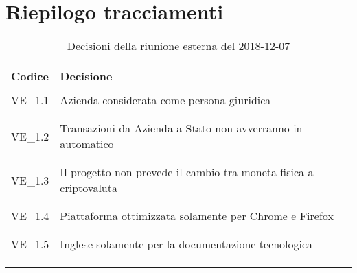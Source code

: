 \section{Riepilogo tracciamenti}
\begin{centering}
\begin{longtable}{ >{\centering}p{4cm} >{\centering}p{11cm} }

\hline
\\[0.5pt]
	\textbf{Codice} & \textbf{Decisione} 
	
	\tabularnewline 
	\hline
	
	
				\\[0.5pt]
				VE\_1.1 & Azienda considerata come persona giuridica
				\\[0.5pt]
				\tabularnewline
				\hline
						
				\\[0.5pt]
				VE\_1.2 & Transazioni da Azienda a Stato non avverranno in automatico
				\\[0.5pt]
				\tabularnewline
				\hline
				
				\\[0.5pt]
				VE\_1.3 & Il progetto non prevede il cambio tra moneta fisica a criptovaluta
				\\[0.5pt]
				\tabularnewline
				\hline
								
				\\[0.5pt]
				VE\_1.4 & Piattaforma ottimizzata solamente per Chrome e Firefox
				\\[0.5pt]
				\tabularnewline
				\hline
				
				\\[0.5pt]
				VE\_1.5 & Inglese solamente per la documentazione tecnologica
				\\[0.5pt]
				\tabularnewline
				\hline
				
                
        \\[0.7pt]
        \caption{Decisioni della riunione esterna del 2018-12-07}
\end{longtable}
\end{centering}


